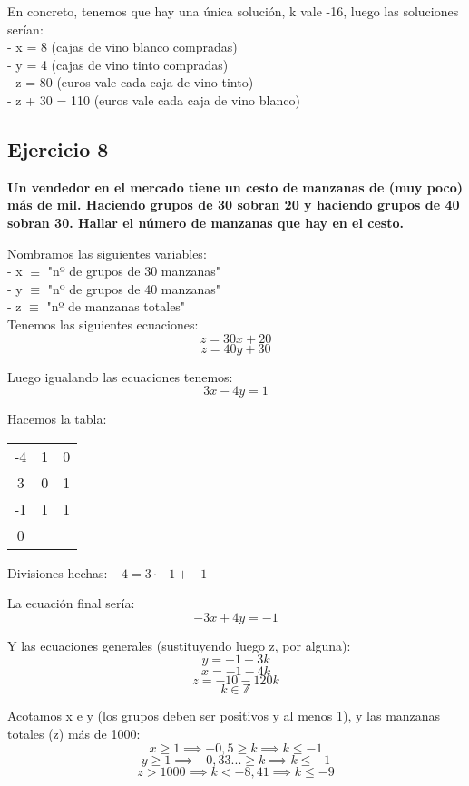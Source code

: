 \documentclass[11pt, a4paper, titlepage]{article}
\providecommand{\ent}{\mathbb{Z}}
\begin{document}
En concreto, tenemos que hay una única solución, k vale -16, luego las soluciones serían: \\
- x = 8 (cajas de vino blanco compradas) \\
- y = 4 (cajas de vino tinto compradas) \\
- z = 80 (euros vale cada caja de vino tinto) \\
- z + 30 = 110 (euros vale cada caja de vino blanco) \\

\subsection{\LARGE{Ejercicio 8}}

\textbf{Un vendedor en el mercado tiene un cesto de manzanas de (muy poco)
más de mil. Haciendo grupos de 30 sobran 20 y haciendo grupos de 40 sobran 30.
Hallar el número de manzanas que hay en el cesto.}

Nombramos las siguientes variables: \\
- x $\equiv$ "nº de grupos de 30 manzanas" \\
- y $\equiv$ "nº de grupos de 40 manzanas" \\
- z $\equiv$ "nº de manzanas totales" \\

Tenemos las siguientes ecuaciones:
$$ z = 30x + 20 $$
$$ z = 40y + 30 $$

Luego igualando las ecuaciones tenemos:
$$ 3x - 4y = 1 $$

Hacemos la tabla:

\begin{center}
\begin{tabular}{c|cc}
-4 & 1 & 0 \\
3 & 0 & 1 \\
\hline
-1 & 1 & 1 \\
\hline
0
\end{tabular}
\end{center}

Divisiones hechas: $ -4 = 3 \cdot -1 + -1 $

La ecuación final sería:
$$ -3x + 4y = -1 $$

Y las ecuaciones generales (sustituyendo luego z, por alguna):
$$ y = -1 - 3k $$
$$ x = -1 - 4k $$
$$ z = -10 - 120k $$
$$ k \in \ent $$

Acotamos x e y (los grupos deben ser positivos y al menos 1), y las manzanas totales (z) más de 1000:
$$ x \geq 1 \implies -0,5 \geq k \implies k \leq -1 $$
$$ y \geq 1 \implies -0,33... \geq k \implies k \leq -1 $$
$$ z > 1000 \implies k < -8,41 \implies k \leq -9 $$
\end{document}
